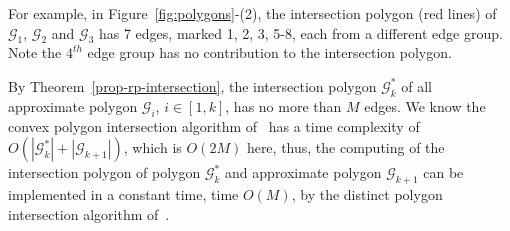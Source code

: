 For example, in Figure~\ref{fig:polygons}-(2), the intersection polygon (red lines) of $\mathcal{G}_1$, $\mathcal{G}_2$ and $\mathcal{G}_3$ has 7 edges, marked 1, 2, 3, 5-8, each from a different edge group. Note the $4^{th}$ edge group has no contribution to the intersection polygon.


By Theorem~\ref{prop-rp-intersection}, the intersection polygon $\mathcal{G}^*_k$ of all approximate polygon $\mathcal{G}_i$, $i \in [1, k]$, has no more than $M$ edges.
We know the convex polygon intersection algorithm of~\cite{ORourke:Intersection} has a time complexity of $O(|\mathcal{G}^*_k| + |\mathcal{G}_{k+1}|)$, which is $O(2M)$ here, thus, the computing of the intersection polygon of polygon $\mathcal{G}^*_k$ and approximate polygon $\mathcal{G}_{k+1}$ can be implemented in a constant time, \ie time $O(M)$, by the distinct polygon intersection algorithm of~\cite{ORourke:Intersection}.
%







